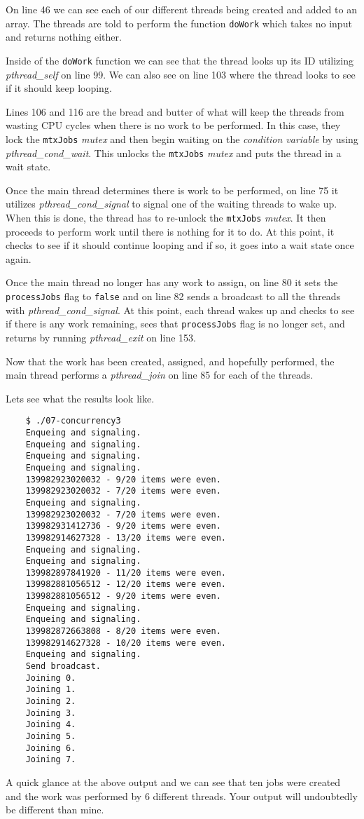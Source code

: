 \documentclass[../main.tex]{subfiles}
\begin{document}
	On line 46 we can see each of our different threads being created and added to an array.  The threads are told to perform the function \texttt{doWork} which takes no input and returns nothing either.
	
	Inside of the \texttt{doWork} function we can see that the thread looks up its ID utilizing \textit{pthread\_self} on line 99.  We can also see on line 103 where the thread looks to see if it should keep looping.
	
	Lines 106 and 116 are the bread and butter of what will keep the threads from wasting CPU cycles when there is no work to be performed.  In this case, they lock the \texttt{mtxJobs} \textit{mutex} and then begin waiting on the \textit{condition variable} by using \textit{pthread\_cond\_wait}.  This unlocks the \texttt{mtxJobs} \textit{mutex} and puts the thread in a wait state.
	
	Once the main thread determines there is work to be performed, on line 75 it utilizes \textit{pthread\_cond\_signal} to signal one of the waiting threads to wake up.  When this is done, the thread has to re-unlock the \texttt{mtxJobs} \textit{mutex}. It then proceeds to perform work until there is nothing for it to do.  At this point, it checks to see if it should continue looping and if so, it goes into a wait state once again.
	
	Once the main thread no longer has any work to assign, on line 80 it sets the \texttt{processJobs} flag to \texttt{false} and on line 82 sends a broadcast to all the threads with \textit{pthread\_cond\_signal}.  At this point, each thread wakes up and checks to see if there is any work remaining, sees that \texttt{processJobs} flag is no longer set, and returns by running \textit{pthread\_exit} on line 153.
	
	Now that the work has been created, assigned, and hopefully performed, the main thread performs a \textit{pthread\_join} on line 85 for each of the threads.
	
	Lets see what the results look like.
	
	\begin{verbatim}
	$ ./07-concurrency3 
	Enqueing and signaling.
	Enqueing and signaling.
	Enqueing and signaling.
	Enqueing and signaling.
	139982923020032 - 9/20 items were even.
	139982923020032 - 7/20 items were even.
	Enqueing and signaling.
	139982923020032 - 7/20 items were even.
	139982931412736 - 9/20 items were even.
	139982914627328 - 13/20 items were even.
	Enqueing and signaling.
	Enqueing and signaling.
	139982897841920 - 11/20 items were even.
	139982881056512 - 12/20 items were even.
	139982881056512 - 9/20 items were even.
	Enqueing and signaling.
	Enqueing and signaling.
	139982872663808 - 8/20 items were even.
	139982914627328 - 10/20 items were even.
	Enqueing and signaling.
	Send broadcast.
	Joining 0.
	Joining 1.
	Joining 2.
	Joining 3.
	Joining 4.
	Joining 5.
	Joining 6.
	Joining 7.
	\end{verbatim}
	
	A quick glance at the above output and we can see that ten jobs were created and the work was performed by 6 different threads.  Your output will undoubtedly be different than mine.
	
\end{document}
